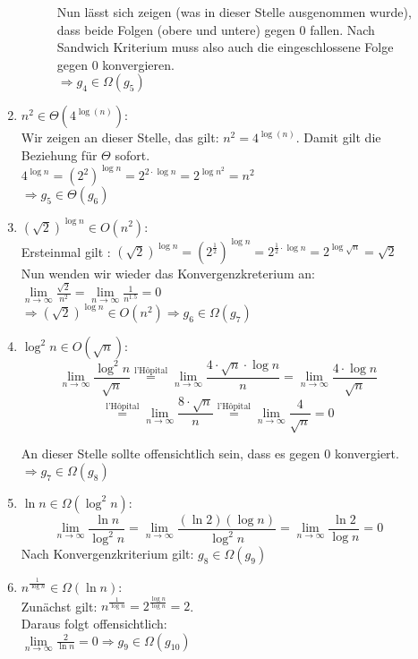 \documentclass[11pt,a4paper,ngerman]{article}
\begin{document}
\begin{description}
\begin{enumerate}[\bfseries 1.]
\begin{description}
Nun lässt sich zeigen (was in dieser Stelle ausgenommen wurde), dass beide Folgen (obere und untere) gegen 0 fallen. Nach Sandwich Kriterium muss also auch die eingeschlossene Folge gegen 0 konvergieren.\\
$\Rightarrow g_4 \in \Omega (g_5)$

\end{description}

\item
$n^2 \in \Theta (4^{\log{(n)}})$: \\
Wir zeigen an dieser Stelle, das gilt: $n^2 = 4^{\log{(n)}}$. Damit gilt die Beziehung für $\Theta$ sofort.\\
$4^{\log n} = (2^2)^{\log n} =  2^{2\cdot \log n} = 2^{\log n^2} = n^2$\\
$\Rightarrow g_5 \in \Theta (g_6)$

\item
$(\sqrt{2})^{\log{n}} \in O (n^2)$:\\
Ersteinmal gilt : $(\sqrt{2})^{\log{n}} = (2^{\frac{1}{2}})^{\log n} = 2^{\frac{1}{2} \cdot \log n} = 2^{\log \sqrt{n}} = \sqrt{2}$\\
Nun wenden wir wieder das Konvergenzkreterium an: \\
$\underset{n\rightarrow\infty}{\lim} \frac{\sqrt{2}}{n^2} = \underset{n\rightarrow\infty}{\lim} \frac{1}{n^{1.5}} = 0$\\
$\Rightarrow (\sqrt{2})^{\log{n}} \in O (n^2) \Rightarrow g_6 \in \Omega (g_7)$

\item
$\log^2 n \in O (\sqrt{n})$: \\
$$\underset{n\rightarrow\infty}{\lim} \frac{\log^2 n}{\sqrt{n}} \stackrel{\text{l'Hôpital}}{=} \underset{n\rightarrow\infty}{\lim} \frac{4\cdot\sqrt{n} \cdot  \log n}{n} = \underset{n\rightarrow\infty}{\lim} \frac{4\cdot \log n}{\sqrt{n} } $$
$$
\stackrel{\text{l'Hôpital}}{=} \underset{n\rightarrow\infty}{\lim} \frac{8\cdot \sqrt{n}}{n} \stackrel{\text{l'Hôpital}}{=} \underset{n\rightarrow\infty}{\lim} \frac{4}{\sqrt{n}} = 0
$$

An dieser Stelle sollte offensichtlich sein, dass es gegen 0 konvergiert.\\ $\Rightarrow g_7 \in \Omega (g_8)$

\item
$\ln n \in \Omega (\log^2 n)$: \\
$$\underset{n\rightarrow\infty}{\lim} \frac{\ln n}{\log^2 n} = \underset{n\rightarrow\infty}{\lim} \frac{(\ln 2)(\log n)}{\log^2 n} = \underset{n\rightarrow\infty}{\lim} \frac{\ln 2}{\log n} = 0$$
Nach Konvergenzkriterium gilt: $g_8 \in \Omega(g_9)$
\item
$n^{\frac{1}{\log n}} \in \Omega (\ln n)$: \\
Zunächst gilt: $n^{\frac{1}{\log n}} = 2^{\frac{\log n}{\log n}} = 2$.\\
Daraus folgt offensichtlich:\\
$\underset{n\rightarrow\infty}{\lim} \frac{2}{\ln n} = 0 \Rightarrow g_9 \in \Omega (g_{10})$

\end{enumerate}
\end{description}
\end{document}
